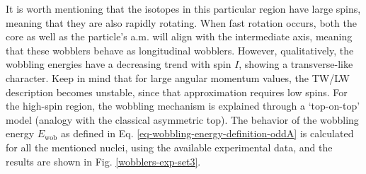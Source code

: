 It is worth mentioning that the isotopes in this particular region have large spins, meaning that they are also rapidly rotating. When fast rotation occurs, both the core as well as the particle's a.m. will align with the intermediate axis, meaning that these wobblers behave as longitudinal wobblers. However, qualitatively, the wobbling energies have a decreasing trend with spin $I$, showing a transverse-like character. Keep in mind that for large angular momentum values, the TW/LW description becomes unstable, since that approximation requires low spins. For the high-spin region, the wobbling mechanism is explained through a `top-on-top' model \cite{hamamoto2002wobbling,tanabe2006algebraic} (analogy with the classical asymmetric top). The behavior of the wobbling energy $E_\text{wob}$ as defined in Eq. \ref{eq-wobbling-energy-definition-oddA} is calculated for all the mentioned nuclei, using the available experimental data, and the results are shown in Fig. \ref{wobblers-exp-set3}.
